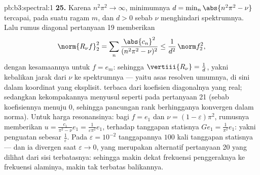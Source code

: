 \begin{solution}{pb:b3:spectral:1}
\textbf{25.} Karena $n^2\pi^2 \to \infty$, minimumnya $d =
\min_n\abs{n^2\pi^2 - \nu}$ tercapai, pada suatu ragam $m$,
dan $d > 0$ sebab $\nu$ menghindari spektrumnya. Lalu rumus diagonal
pertanyaan 19 memberikan
\[
\norm{R_\nu f}_2^2 =
\sum_n\frac{\abs{c_n}^2}{(n^2\pi^2 - \nu)^2}
\leq \frac1{d^2}\,\norm f_2^2,
\]
dengan kesamaannya untuk $f = e_m$: sehingga $\vertiii{R_\nu} = \frac1d$,
yakni kebalikan jarak dari $\nu$ ke spektrumnya
--- yaitu asas resolven umumnya, di sini dalam koordinat yang
eksplisit.  terbaca dari koefisien diagonalnya
yang real; sedangkan kekompakannya menyusul seperti pada pertanyaan 21 (sebab
koefisiennya menuju $0$, sehingga pancungan rank berhingganya
konvergen dalam norma). Untuk harga resonansinya: bagi $f = e_1$ dan $\nu =
(1-\varepsilon)\pi^2$, rumusnya memberikan $u =
\frac{c_1}{\pi^2 - \nu}e_1 = \frac1{\varepsilon\pi^2}e_1$,
terhadap tanggapan statisnya $Ge_1 = \frac1{\pi^2}e_1$: yakni
penguatan sebesar $\frac1\varepsilon$. Pada $\varepsilon =
10^{-2}$ tanggapannya $100$ kali tanggapan statisnya --- dan
ia divergen saat $\varepsilon \to 0$, yang merupakan alternatif
pertanyaan 20 yang dilihat dari sisi terbatasnya: sehingga makin dekat
frekuensi penggeraknya ke frekuensi alaminya, makin tak terbatas
balikannya.

\end{solution}
